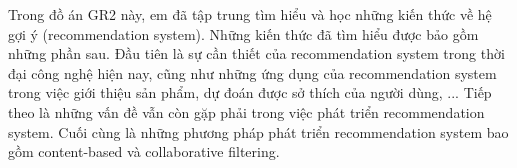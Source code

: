 Trong đồ án GR2 này, em đã tập trung tìm hiểu và học những kiến thức về hệ gợi ý (recommendation system). Những kiến thức đã tìm hiểu được bảo gồm những phần sau. Đầu tiên là sự cần thiết của recommendation system trong thời đại công nghệ hiện nay, cũng như những ứng dụng của recommendation system trong việc giới thiệu sản phẩm, dự đoán được sở thích của người dùng, ... Tiếp theo là những vấn đề vẫn còn gặp phải trong việc phát triển recommendation system. Cuối cùng là những phương pháp phát triển recommendation system bao gồm content-based và collaborative filtering.